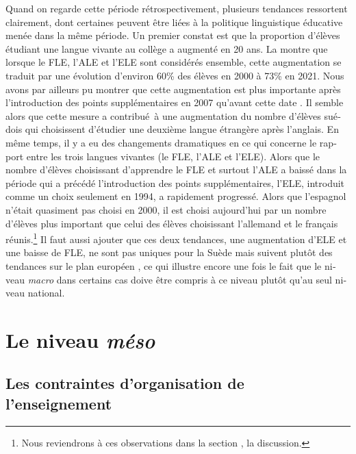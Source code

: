 \documentclass[french, output=paper]{langscibook}
\begin{document}
\begin{otherlanguage}{french}
Quand on regarde cette période rétrospectivement, plusieurs tendances ressortent clairement, dont certaines peuvent être liées à la politique linguistique éducative menée dans la même période. Un premier constat est que la proportion d’élèves étudiant une langue vivante au collège a augmenté en 20 ans. La  montre que lorsque le FLE, l’ALE et l’ELE sont considérés ensemble, cette augmentation se traduit par une évolution d’environ 60\% des élèves en 2000 à 73\% en 2021. Nous avons par ailleurs pu montrer que cette augmentation est plus importante après l’introduction des points supplémentaires en 2007 qu’avant cette date \citep{GranfeldtEtAl2021}. Il semble alors que cette mesure a contribué~à une augmentation du nombre d’élèves suédois qui choisissent d’étudier une deuxième langue étrangère après l’anglais. En même temps, il y a eu des changements dramatiques en ce qui concerne le rapport entre les trois langues vivantes (le FLE, l’ALE et l’ELE). Alors que le nombre d’élèves choisissant d’apprendre le FLE et surtout l’ALE a baissé dans la période qui a précédé l’introduction des points supplémentaires, l’ELE, introduit comme un choix seulement en 1994, a rapidement progressé. Alors que l’espagnol n’était quasiment pas choisi en 2000, il est choisi aujourd’hui par un nombre d’élèves plus important que celui des élèves choisissant l’allemand et le français réunis.\footnote{Nous reviendrons à ces observations dans la section , la discussion.} Il faut aussi ajouter que ces deux tendances, une augmentation d’ELE et une baisse de FLE, ne sont pas uniques pour la Suède mais suivent plutôt des tendances sur le plan européen \citep{Eurostat2022}, ce qui illustre encore une fois le fait que le niveau \textit{macro} dans certains cas doive être compris à ce niveau plutôt qu’au seul niveau national. 

\section{Le niveau \textit{méso}}\label{sec:granfeldt:4}

\subsection{Les contraintes d’organisation de l’enseignement}\label{sec:granfeldt:4.1}


\end{otherlanguage}
\end{document}
